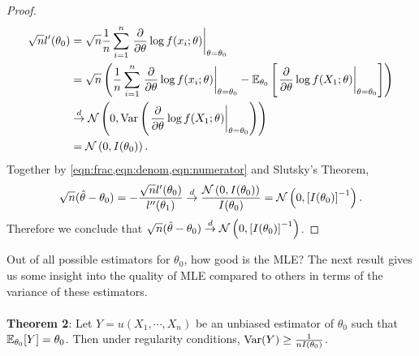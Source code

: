 \begin{proof}
\begin{align}
\sqrt{n}l'(\theta_0) &= \sqrt{n}\frac{1}{n}\sum_{i=1}^n \left.\frac{\partial}{\partial\theta}\log f(x_i;\theta)\right\vert_{\theta=\theta_0}\\
&= \sqrt{n}\left( \frac{1}{n}\sum_{i=1}^n \left.\frac{\partial}{\partial\theta}\log f(x_i;\theta)\right\vert_{\theta=\theta_0} - \mathbb{E}_{\theta_0}\left[ \left.\frac{\partial}{\partial\theta}\log f(X_1;\theta)\right\vert_{\theta=\theta_0} \right] \right)\\
&\overset{d}{\rightarrow} \mathcal{N}\left(0, \text{Var}\left( \left.\frac{\partial}{\partial\theta}\log f(X_1;\theta)\right\vert_{\theta=\theta_0} \right)\right)\\
&= \mathcal{N}\left( 0, I(\theta_0) \right). \label{eqn:numerator}
\end{align}
Together by \cref{eqn:frac,eqn:denom,eqn:numerator} and Slutsky's Theorem,
\begin{align}
\sqrt{n}(\hat{\theta} - \theta_0) = -\frac{\sqrt{n}l'(\theta_0)}{l''(\theta_1)} \overset{d}{\rightarrow} \frac{\mathcal{N}\left(0,I(\theta_0)\right)}{I(\theta_0)} = \mathcal{N}\left(0, \left[ I(\theta_0) \right]^{-1}\right).
\end{align}
Therefore we conclude that $\sqrt{n}(\hat{\theta} - \theta_0)\overset{d}{\rightarrow}\mathcal{N}\left(0, \left[ I(\theta_0) \right]^{-1}\right)$.
\end{proof}
$ $\\
Out of all possible estimators for $\theta_0$, how good is the MLE? The next result gives us some insight into the quality of MLE compared to others in terms of the variance of these estimators.\\\\
\textbf{Theorem 2}: Let $Y = u(X_1,\cdots,X_n)$ be an unbiased estimator of $\theta_0$ such that $\mathbb{E}_{\theta_0}[Y] = \theta_0$. Then under regularity conditions, $\text{Var}(Y) \geq \frac{1}{nI(\theta_0)}$.
